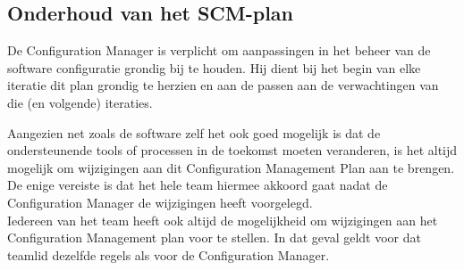 \subsection{Onderhoud van het SCM-plan}

De Configuration Manager is verplicht om aanpassingen in het beheer van de software configuratie grondig bij te houden. Hij dient bij het begin van elke iteratie dit plan grondig te herzien en aan de passen aan de verwachtingen van die (en volgende) iteraties.

Aangezien net zoals de software zelf het ook goed mogelijk is dat de ondersteunende tools of processen in de toekomst moeten veranderen, is het altijd mogelijk om wijzigingen aan dit Configuration Management Plan aan te brengen. De enige vereiste is dat het hele team hiermee akkoord gaat nadat de Configuration Manager de wijzigingen heeft voorgelegd. \\

Iedereen van het team heeft ook altijd de mogelijkheid om wijzigingen aan het Configuration Management plan voor te stellen. In dat geval geldt voor dat teamlid dezelfde regels als voor de Configuration Manager.